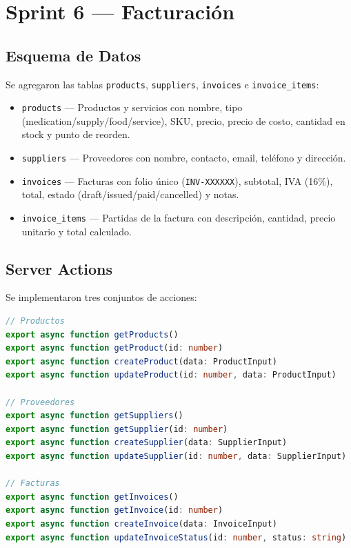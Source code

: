\documentclass[12pt,a4paper]{article}
\begin{document}
\section{Sprint 6 --- Facturación}

\subsection{Esquema de Datos}

Se agregaron las tablas \texttt{products}, \texttt{suppliers}, \texttt{invoices} e \texttt{invoice\_items}:

\begin{itemize}[leftmargin=*]
    \item \texttt{products} --- Productos y servicios con nombre, tipo (medication/supply/food/service),
          SKU, precio, precio de costo, cantidad en stock y punto de reorden.
    \item \texttt{suppliers} --- Proveedores con nombre, contacto, email, teléfono y dirección.
    \item \texttt{invoices} --- Facturas con folio único (\texttt{INV-XXXXXX}), subtotal,
          IVA (16\%), total, estado (draft/issued/paid/cancelled) y notas.
    \item \texttt{invoice\_items} --- Partidas de la factura con descripción, cantidad,
          precio unitario y total calculado.
\end{itemize}

\subsection{Server Actions}

Se implementaron tres conjuntos de acciones:

\begin{lstlisting}[language=TypeScript, caption=API de server actions para facturación]
// Productos
export async function getProducts()
export async function getProduct(id: number)
export async function createProduct(data: ProductInput)
export async function updateProduct(id: number, data: ProductInput)

// Proveedores
export async function getSuppliers()
export async function getSupplier(id: number)
export async function createSupplier(data: SupplierInput)
export async function updateSupplier(id: number, data: SupplierInput)

// Facturas
export async function getInvoices()
export async function getInvoice(id: number)
export async function createInvoice(data: InvoiceInput)
export async function updateInvoiceStatus(id: number, status: string)
\end{lstlisting}
\end{document}

